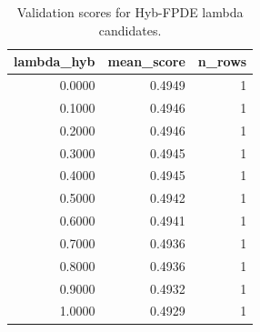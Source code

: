 \begin{table}[t]
\caption{Validation scores for Hyb-FPDE lambda candidates.}
\label{tab:lambda_distribution_computed}
\centering
\begin{tabular}{rrr}
\toprule
lambda\_hyb & mean\_score & n\_rows \\
\midrule
0.0000 & 0.4949 & 1 \\
0.1000 & 0.4946 & 1 \\
0.2000 & 0.4946 & 1 \\
0.3000 & 0.4945 & 1 \\
0.4000 & 0.4945 & 1 \\
0.5000 & 0.4942 & 1 \\
0.6000 & 0.4941 & 1 \\
0.7000 & 0.4936 & 1 \\
0.8000 & 0.4936 & 1 \\
0.9000 & 0.4932 & 1 \\
1.0000 & 0.4929 & 1 \\
\bottomrule
\end{tabular}

\end{table}
